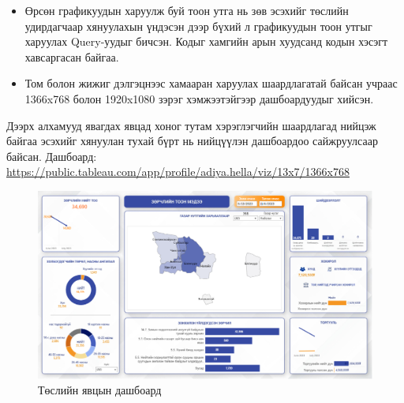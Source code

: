 \begin{itemize}
\begin{minipage}[t]{\linewidth}
			\end{minipage}
	\item Өрсөн графикуудын харуулж буй тоон утга нь зөв эсэхийг төслийн удирдагчаар хянуулахын үндэсэн дээр бүхий л графикуудын тоон утгыг харуулах Query-уудыг бичсэн. Кодыг хамгийн арын хуудсанд кодын хэсэгт хавсаргасан байгаа.
	\item Том болон жижиг дэлгэцнээс хамааран харуулах шаардлагатай байсан учраас 1366x768 болон 1920x1080 зэрэг хэмжээтэйгээр дашбоардуудыг хийсэн.
  \end{itemize}

  Дээрх алхамууд явагдах явцад хоног тутам хэрэглэгчийн шаардлагад нийцэж байгаа эсэхийг хянуулан тухай бүрт нь нийцүүлэн дашбоардоо сайжруулсаар байсан.
\newpage
Дашбоард: \url{https://public.tableau.com/app/profile/adiya.hella/viz/13x7/1366x768}
\begin{figure}
	\centering
	\includegraphics[width=15cm]{images/dash2.PNG}
	\caption{Төслийн явцын дашбоард}
	\label{fig:form}
\end{figure}
